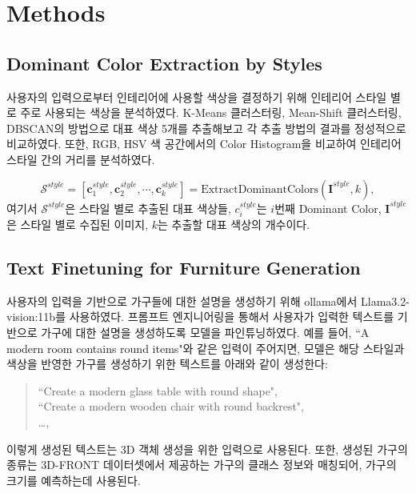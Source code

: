 \documentclass[11pt]{article}
\begin{document}
\section{Methods}
\subsection{Dominant Color Extraction by Styles}
사용자의 입력으로부터 인테리어에 사용할 색상을 결정하기 위해 인테리어 스타일 별로 주로 사용되는 색상을 분석하였다.
K-Means 클러스터링, Mean-Shift 클러스터링, DBSCAN의 방법으로 대표 색상 5개를 추출해보고 각 추출 방법의 결과를 정성적으로 비교하였다.
또한, RGB, HSV 색 공간에서의 Color Histogram을 비교하여 인테리어 스타일 간의 거리를 분석하였다.

\begin{equation}
    \label{eq:color_extraction}
    \mathcal{S}^{style} = \left[ \mathbf{c}^{style}_1, \mathbf{c}^{style}_2, \cdots , \mathbf{c}^{style}_k \right]= \text{ExtractDominantColors}(\mathbf{I}^{style}, k) ,
\end{equation}
여기서 $\mathcal{S}^{style}$은 스타일 별로 추출된 대표 색상들, $c^{style}_i$는 $i$번째 Dominant Color, $\mathbf{I}^{style}$은 스타일 별로 수집된 이미지, $k$는 추출할 대표 색상의 개수이다.

\subsection{Text Finetuning for Furniture Generation}
사용자의 입력을 기반으로 가구들에 대한 설명을 생성하기 위해 ollama에서 Llama3.2-vision:11b\cite{touvron2024llama3}를 사용하였다. 프롬프트 엔지니어링을 통해서 사용자가 입력한 텍스트를 기반으로 가구에 대한 설명을 생성하도록 모델을 파인튜닝하였다.
예를 들어, ``A modern room contains round items"와 같은 입력이 주어지면, 모델은 해당 스타일과 색상을 반영한 가구를 생성하기 위한 텍스트를 아래와 같이 생성한다:
\begin{quote}
    ``Create a modern glass table with round shape", \\
    ``Create a modern wooden chair with round backrest", \\
    \dots,
\end{quote}
이렇게 생성된 텍스트는 3D 객체 생성을 위한 입력으로 사용된다. 또한, 생성된 가구의 종류는 3D-FRONT 데이터셋에서 제공하는 가구의 클래스 정보와 매칭되어, 가구의 크기를 예측하는데 사용된다.
\end{document}
